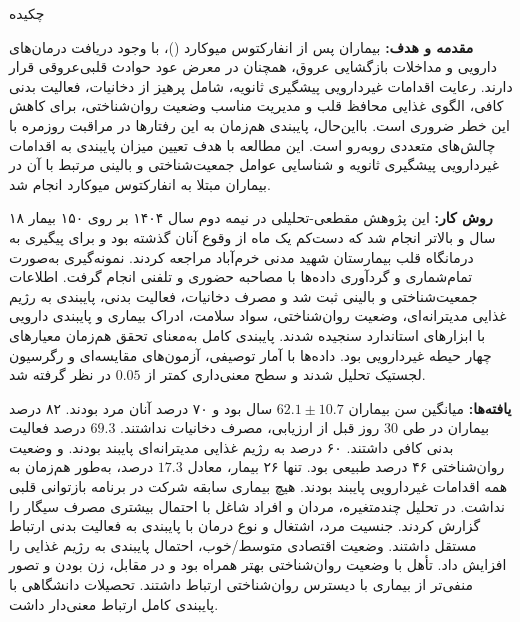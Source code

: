 \ChapterStart
\begin{center}
  {\XTitr\fontsize{16pt}{20pt}\selectfont \ThesisTitleFA\par}
  \vspace{1.2em}
  {\XTitr\fontsize{16pt}{20pt}\selectfont چکیده}
\end{center}
\vspace{1em}
\noindent\textbf{مقدمه و هدف:}
بیماران پس از انفارکتوس میوکارد ()، با وجود دریافت درمان‌های دارویی و مداخلات بازگشایی عروق، همچنان در معرض عود حوادث قلبی‌عروقی قرار دارند. رعایت اقدامات غیردارویی پیشگیری ثانویه، شامل پرهیز از دخانیات، فعالیت بدنی کافی، الگوی غذایی محافظ قلب و مدیریت مناسب وضعیت روان‌شناختی، برای کاهش این خطر ضروری است. بااین‌حال، پایبندی هم‌زمان به این رفتارها در مراقبت روزمره با چالش‌های متعددی روبه‌رو است. این مطالعه با هدف تعیین میزان پایبندی به اقدامات غیردارویی پیشگیری ثانویه و شناسایی عوامل جمعیت‌شناختی و بالینی مرتبط با آن در بیماران مبتلا به انفارکتوس میوکارد انجام شد.

\vspace{0.6em}
\noindent\textbf{روش کار:}
این پژوهش مقطعی‌-‌تحلیلی در نیمه دوم سال ۱۴۰۴ بر روی ۱۵۰ بیمار ۱۸ سال و بالاتر انجام شد که دست‌کم یک ماه از وقوع  آنان گذشته بود و برای پیگیری به درمانگاه قلب بیمارستان شهید مدنی خرم‌آباد مراجعه کردند. نمونه‌گیری به‌صورت تمام‌شماری و گردآوری داده‌ها با مصاحبه حضوری و تلفنی انجام گرفت. اطلاعات جمعیت‌شناختی و بالینی ثبت شد و مصرف دخانیات، فعالیت بدنی، پایبندی به رژیم غذایی مدیترانه‌ای، وضعیت روان‌شناختی، سواد سلامت، ادراک بیماری و پایبندی دارویی با ابزارهای استاندارد سنجیده شدند. پایبندی کامل به‌معنای تحقق هم‌زمان معیارهای چهار حیطه غیردارویی بود. داده‌ها با آمار توصیفی، آزمون‌های مقایسه‌ای و رگرسیون لجستیک تحلیل شدند و سطح معنی‌داری کمتر از $0.05$ در نظر گرفته شد.

\vspace{0.6em}
\noindent\textbf{یافته‌ها:}
میانگین سن بیماران $62.1 \pm 10.7$ سال بود و ۷۰ درصد آنان مرد بودند. ۸۲ درصد بیماران در طی 30 روز قبل از ارزیابی، مصرف دخانیات نداشتند. $69.3$ درصد فعالیت بدنی کافی داشتند. ۶۰ درصد به رژیم غذایی مدیترانه‌ای پایبند بودند. و وضعیت روان‌شناختی ۴۶ درصد طبیعی بود. تنها ۲۶ بیمار، معادل $17.3$ درصد، به‌طور هم‌زمان به همه اقدامات غیردارویی پایبند بودند. هیچ بیماری سابقه شرکت در برنامه بازتوانی قلبی نداشت. در تحلیل چندمتغیره، مردان و افراد شاغل با احتمال بیشتری مصرف سیگار را گزارش کردند. جنسیت مرد، اشتغال و نوع درمان با پایبندی به فعالیت بدنی ارتباط مستقل داشتند. وضعیت اقتصادی متوسط/خوب، احتمال پایبندی به رژیم غذایی را افزایش داد. تأهل با وضعیت روان‌شناختی بهتر همراه بود و در مقابل، زن بودن و تصور منفی‌تر از بیماری با دیسترس روان‌شناختی ارتباط داشتند. تحصیلات دانشگاهی با پایبندی کامل ارتباط معنی‌دار داشت.


